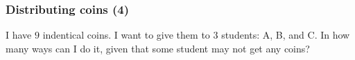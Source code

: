 \begin{frame}\frametitle{Distributing coins (4)}
  \begin{tcolorbox}
    I have $9$ indentical coins.  I want to give them to $3$ students:
    A, B, and C.  In how many ways can I do it, given that some
    student may not get any coins?
  \end{tcolorbox}
  
  \vspace{1.5in}
\end{frame}
